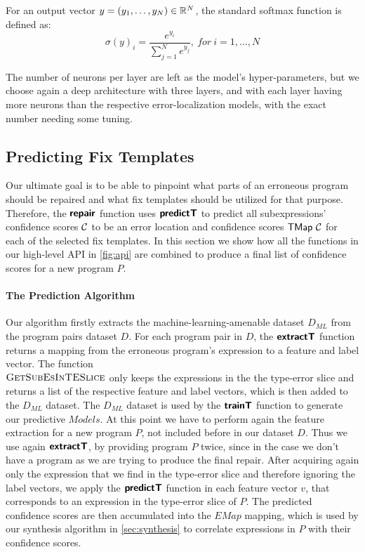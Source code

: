 For an output vector $y = (y_1, \dots, y_N) \in \mathbb{R}^{N}$, the standard softmax
function is defined as:
\[ \sigma(y)_i = \frac{e^{y_i}}{\sum_{j=1}^{N} e^{y_j}},\ for\ i = 1, \dots, N \]

The number of neurons per layer are left as the model's hyper-parameters, but we
choose again a deep architecture with three layers, and with each layer having
more neurons than the respective error-localization models, with the exact
number needing some tuning.



\subsection{Predicting Fix Templates}
\label{subsec:predict}

Our ultimate goal is to be able to pinpoint what parts of an erroneous program
should be repaired and what fix templates should be utilized for that purpose.
Therefore, the $\bm{\mathsf{repair}}$ function uses $\bm{\mathsf{predictT}}$ to predict all
subexpressions' confidence scores $\mathcal{C}$ to be an error location and
confidence scores $\mathsf{TMap}\ \mathcal{C}$ for each of the selected fix templates. In
this section we show how all the functions in our high-level API in
\autoref{fig:api} are combined to produce a final list of confidence scores for
a new program $P$.

\paragraph{The Prediction Algorithm}
Our algorithm firstly extracts the machine-learning-amenable dataset $D_{ML}$
from the program pairs dataset $D$. For each program pair in $D$, the
$\bm{\mathsf{extractT}}$ function returns a mapping from the erroneous program's
expression to a feature and label vector. The function \\
$\textsc{GetSubEsInTESlice}$ only keeps the expressions in the the type-error
slice and returns a list of the respective feature and label vectors, which is
then added to the $D_{ML}$ dataset. The $D_{ML}$ dataset is used by the
$\bm{\mathsf{trainT}}$ function to generate our predictive $Models$. At this point we have
to perform again the feature extraction for a new program $P$, not included
before in our dataset $D$. Thus we use again $\bm{\mathsf{extractT}}$, by providing
program $P$ twice, since in the case we don't have a program as we are trying to
produce the final repair. After acquiring again only the expression that we find
in the type-error slice and therefore ignoring the label vectors, we apply the
$\bm{\mathsf{predictT}}$ function in each feature vector $v$, that corresponds to an
expression in the type-error slice of $P$. The predicted confidence scores are
then accumulated into the $EMap$ mapping, which is used by our synthesis
algorithm in \autoref{sec:synthesis} to correlate expressions in $P$ with their
confidence scores.


